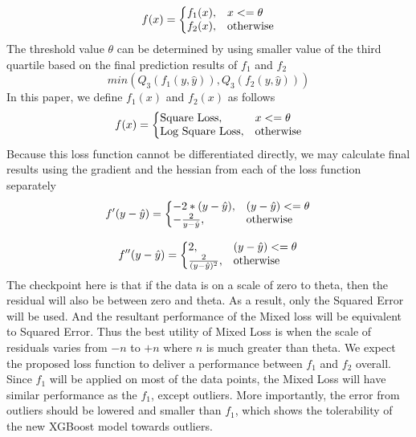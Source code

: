 \documentclass[runningheads]{llncs}
\begin{document}
\begin{equation}
  f(x)=\left\{
  \begin{array}{@{}ll@{}}
    f_1(x), & x<=\theta \\
    f_2(x), & \text{otherwise}
  \end{array}\right.
\end{equation}
The threshold value $\theta$ can be determined by using smaller value of the third quartile based on the final prediction results of $f_1$ and $f_2$
\begin{equation}
    min(Q_3(f_1(y, \hat{y})), Q_3(f_2(y, \hat{y})))
\end{equation}
In this paper, we define $f_1(x)$ and $f_2(x)$ as follows
\begin{equation}
  f(x)=\left\{
  \begin{array}{@{}ll@{}}
    \text{Square Loss}, & x<=\theta \\
    \text{Log Square Loss}, & \text{otherwise}
  \end{array}\right.
\end{equation}
Because this loss function cannot be differentiated directly, we may calculate final results using the gradient and the hessian from each of the loss function separately
\begin{equation}
  f'(y - \hat{y})=\left\{
  \begin{array}{@{}ll@{}}
    -2*(y - \hat{y}), &  (y - \hat{y})<=\theta \\
    -\frac{2}{y - \hat{y}}, & \text{otherwise}
  \end{array}\right.
\end{equation}

\begin{equation}
  f''(y - \hat{y})=\left\{
  \begin{array}{@{}ll@{}}
    2, & (y - \hat{y})<=\theta \\
    \frac{2}{(y - \hat{y})^2}, & \text{otherwise}
  \end{array}\right.
\end{equation}
The checkpoint here is that if the data is on a scale of zero to theta, then the residual will also be between zero and theta. As a result, only the Squared Error will be used. And the resultant performance of the Mixed loss will be equivalent to Squared Error. Thus the best utility of Mixed Loss is when the scale of residuals varies from $-n$ to $+n$ where $n$ is much greater than theta. We expect the proposed loss function to deliver a performance between $f_1$ and $f_2$ overall. Since $f_1$ will be applied on most of the data points, the Mixed Loss will have similar performance as the $f_1$, except outliers. More importantly, the error from outliers should be lowered and smaller than $f_1$, which shows the tolerability of the new XGBoost model towards outliers.
\end{document}
